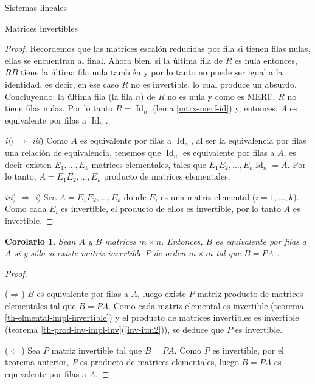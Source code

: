 \documentclass[a4paper,12pt,twoside,spanish,reqno]{amsbook}
\newtheorem{corolario}[teorema]{Corolario}
\theoremstyle{definition}
\theoremstyle{remark}
\newcommand{\Id}{\operatorname{Id}}
\begin{document}
\begin{chapter}{Sistemas lineales}
\begin{section}{Matrices invertibles}
\begin{proof}
				Recordemos que las matrices escalón reducidas por fila si tienen filas nulas, ellas se encuentran al final.  Ahora bien,  si la última fila de $R$ es nula entonces,  $RB$ tiene la última fila nula también y por lo tanto no puede ser igual a la identidad, es decir, en ese caso $R$ no es invertible, lo cual produce un absurdo. Concluyendo: la última fila (la fila $n$) de $R$ no es nula y como es MERF, $R$ no tiene filas nulas. Por lo tanto $R=\Id_n$ (lema \ref{mtrx-merf-id}) y,  entonces, $A$ es equivalente por filas a $\Id_n$. 
				
				\textit{ii}) $\Rightarrow$ \textit{iii})\; Como $A$  es equivalente por filas a $\Id_n$, al ser la equivalencia por filas una relación de equivalencia,  tenemos que $\Id_n$ es equivalente por filas a $A$, es decir  existen $E_1,\ldots,E_k$ matrices elementales, tales que $E_1E_2,\ldots,E_k\Id_n = A$. Por lo tanto, $A =E_1E_2,\ldots,E_k$ producto de matrices elementales.
				
				\textit{iii}) $\Rightarrow$ \textit{i}) \; Sea $A = E_1E_2,\ldots,E_k$ donde $E_i$  es una matriz elemental ($i=1,\ldots,k$). Como cada $E_i$ es invertible,  el producto de ellos es invertible,  por lo tanto $A$ es invertible.
			\end{proof}	
			
			\begin{corolario}
				Sean $A$ y $B$ matrices $m \times n$. Entonces,   $B$ es equivalente por filas a $A$ si y sólo si existe matriz invertible $P$ de orden $m \times m$ tal que $B =PA$ . 
			\end{corolario}
			\begin{proof}
				
				\
				
				($\Rightarrow$) $B$ es equivalente por filas a $A$,  luego existe $P$ matriz producto de matrices elementales tal que $B =PA$. Como cada matriz elemental es invertible (teorema \ref{th-elmental-impl-invertible}) y el producto de matrices invertibles es invertible (teorema  \ref{th-prod-inv-impl-inv}(\ref{inv-itm2})), se deduce que $P$ es invertible. 
				
				($\Leftarrow$) Sea  $P$  matriz invertible tal que $B =PA$. Como $P$ es invertible, por el teorema anterior, $P$ es producto de matrices elementales, luego $B =PA$ es equivalente por filas a $A$.
			\end{proof}	
			

\end{section}
\end{chapter}
\end{document}
